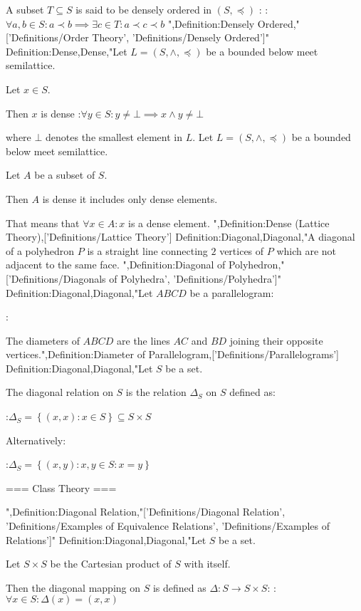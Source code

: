 A subset $T \subseteq S$ is said to be densely ordered in $\left( S, \preceq \right)$ :
:$\forall a, b \in S: a \prec b \implies \exists c \in T: a \prec c \prec b$
",Definition:Densely Ordered,"['Definitions/Order Theory', 'Definitions/Densely Ordered']"
Definition:Dense,Dense,"Let $L = \left( S, \wedge, \preceq \right)$ be a bounded below meet semilattice.

Let $x \in S$.


Then $x$ is dense 
:$\forall y \in S: y \ne \bot \implies x \wedge y \ne \bot$

where $\bot$ denotes the smallest element in $L$.
Let $L = \left( S, \wedge, \preceq \right)$ be a bounded below meet semilattice.

Let $A$ be a subset of $S$.


Then $A$ is dense  it includes only dense elements.

That means that  $\forall x \in A: x$ is a dense element.
",Definition:Dense (Lattice Theory),['Definitions/Lattice Theory']
Definition:Diagonal,Diagonal,"A diagonal of a polyhedron $P$ is a straight line connecting $2$ vertices of $P$ which are not adjacent to the same face.
",Definition:Diagonal of Polyhedron,"['Definitions/Diagonals of Polyhedra', 'Definitions/Polyhedra']"
Definition:Diagonal,Diagonal,"Let $ABCD$ be a parallelogram:

:

The diameters of $ABCD$ are the lines $AC$ and $BD$ joining their opposite vertices.",Definition:Diameter of Parallelogram,['Definitions/Parallelograms']
Definition:Diagonal,Diagonal,"Let $S$ be a set.

The diagonal relation on $S$ is the relation $\Delta_S$ on $S$ defined as:

:$\Delta_S = \left\lbrace \left( x, x \right): x \in S \right\rbrace \subseteq S \times S$

Alternatively:

:$\Delta_S = \left\lbrace \left( x, y \right): x, y \in S: x = y \right\rbrace$


=== Class Theory ===


",Definition:Diagonal Relation,"['Definitions/Diagonal Relation', 'Definitions/Examples of Equivalence Relations', 'Definitions/Examples of Relations']"
Definition:Diagonal,Diagonal,"Let $S$ be a set.

Let $S \times S$ be the Cartesian product of $S$ with itself.


Then the diagonal mapping on $S$ is defined as $\Delta: S \to S \times S$:
:$\forall x \in S: \Delta \left({x}\right) = \left({x, x}\right)$


